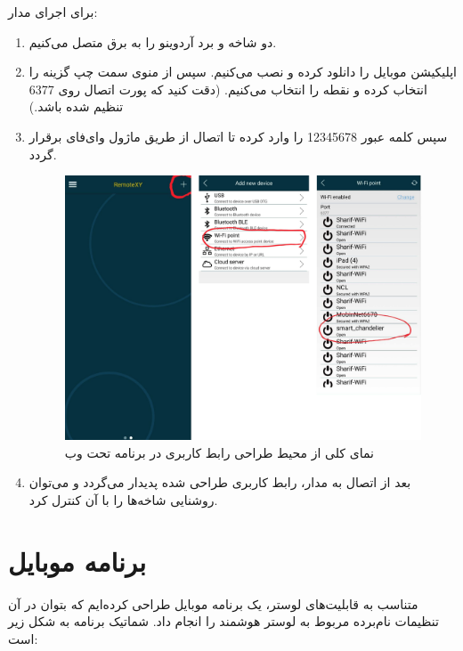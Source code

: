 \documentclass[12pt,a4paper]{article}
\begin{document}
برای اجرای مدار:
\begin {enumerate}
\item
دو شاخه  و برد آردوینو را به برق متصل می‌کنیم.
\item
اپلیکیشن موبایل  را دانلود کرده و نصب می‌کنیم. سپس از منوی سمت چپ گزینه   را انتخاب کرده و نقطه   را انتخاب می‌کنیم. (دقت کنید که پورت اتصال روی 6377 تنظیم شده باشد.)
\item
سپس کلمه عبور 12345678 را وارد کرده تا اتصال از طریق ماژول وای‌فای برقرار گردد.
 	 \begin{figure}[H]
	\centering
	\includegraphics[scale=0.3]{figs/item3.png}
	\caption{
		نمای کلی از محیط طراحی رابط کاربری در برنامه تحت وب 
	}
	\label{fig:schema1}
\end{figure}
\item
بعد از اتصال به مدار، رابط کاربری طراحی شده پدیدار می‌گردد و می‌توان روشنایی شاخه‌ها را با آن کنترل کرد.

\end {enumerate}

	
	
	\newpage
\section{برنامه موبایل}
متناسب به قابلیت‌های لوستر، یک برنامه موبایل طراحی کرده‌ایم که بتوان در آن تنظیمات نام‌برده مربوط به لوستر هوشمند را انجام داد. شماتیک برنامه به شکل زیر است:
\end{document}
